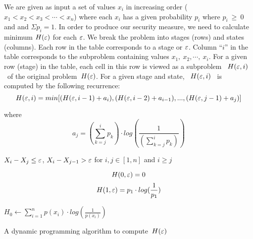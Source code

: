 \documentclass{llncs}
\begin{document}
We are given as input a set of values $x_{i}$ in increasing order
($x_{1}<x_{2}<x_{3}<\cdots<x_{n}$) where each $x_{i}$ has a given
probability $p_{i}$ where $p_{i}~\geq~0$ and and $\Sigma p_{i}=1$.
In order to produce our security measure, we need to calculate
minimum $H(\huge{\varepsilon})$ for each $\huge{\varepsilon}$. We
break the problem into stages (rows) and states (columns). Each
row in the table corresponds to a stage or $\huge{\varepsilon}$. Column ``$i$''
in the table corresponds to  the subproblem containing values
$x_{1},~x_{2},\cdots,~x_{i}$. For a given row (stage) in the
table, each cell in this row is viewed as a subproblem
~$H(\huge{\varepsilon},i)$~of the original
problem~$H(\huge{\varepsilon})$. For a given stage and state,
~$H(\huge{\varepsilon},i)$~ is computed by the following
recurrence:
$$H(\huge{\varepsilon},i)=min[(H(\huge{\varepsilon},i-1)+a_{i}),(H(\huge{\varepsilon},i-2)+a_{i-1}),...,(H(\huge{\varepsilon},j-1)+a_{j})]$$

\noindent
where $$a_{j} = (\sum_{k=j}^{i} p_{k})\cdot log (\frac{1}{(\sum_{k=j}^{i} p_{k})})$$
\begin{center}
$X_{i}-X_{j} \leq  \huge{\varepsilon}$, $X_{i}-X_{j-1}>\huge{\varepsilon}$ for  $i,j \in [1,n]$ and  $i \geq j$
\end{center}
 $$H(0,\huge{\varepsilon})= 0$$
 $$H(1,\huge{\varepsilon})= p_{1}\cdot log (\frac{1}{p_{1}})$$






\begin{algorithm}[H] \footnotesize
  \SetLine

  $H_{0} \leftarrow  \sum_{i=1}^{n} p(x_{i})\cdot log (\frac{1}{p(x_{i})})$\;

  \caption{A dynamic programming algorithm to compute~$H(\huge{\varepsilon})$}\label{algorithm:DPALGO1}
\end{algorithm}
\end{document}
